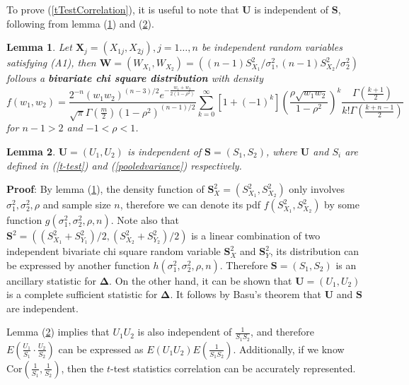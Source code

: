 \documentclass[12pt, a4paper]{article}
\newtheorem{lemma}{Lemma}
\begin{document}
	To prove (\ref{tTestCorrelation}), it is useful to note that $\bm U$ is independent of $\bm S$,
	following from lemma (\ref{lemmabiChisq}) and (\ref{lemmaIndep}).
	\begin{lemma}\label{lemmabiChisq}
		Let $\bm X_j = (X_{1j}, X_{2j}), j=1 \ldots, n$ be independent random variables satisfying (A1),
		then $\bm W = (W_{X_1},W_{X_2}) =((n-1)S_{X_1}^2/{\sigma_1^2}, (n-1)S_{X_2}^2/{\sigma_2^2})$ 
		follows a \textbf{bivariate chi square distribution} with density \citep{joarder2009moments} 
		\begin{equation}\label{biChisq}
			f(w_1, w_2) = \frac{2^{-n}(w_1w_2)^{(n-3)/2}e^{-\frac{w_1 +
						w_2}{2(1-\rho^2)}}}{\sqrt{\pi}\Gamma(\frac{m}{2})(1-\rho^2)^{(n-1)/2}}\sum_{k=0}^{\infty}[1 +
			(-1)^k]\left(\frac{\rho\sqrt{w_1w_2}}{1-\rho^2}\right)^k\frac{\Gamma(\frac{k+1}{2})}{k!\Gamma(\frac{k
					+ n-1}{2})}
		\end{equation}
		for $n-1>2$ and $-1<\rho < 1$.
	\end{lemma}
	\begin{lemma}\label{lemmaIndep}
		$\bm U =(U_1, U_2)$ is independent of $\bm S = (S_1 ,S_2)$, where $\bm U$ and $S_i$ are defined in
		(\ref{t-test})  and (\ref{pooledvariance}) respectively.
	\end{lemma}
	\textbf{Proof}: By lemma (\ref{lemmabiChisq}), the density function of $\bm S^2_X=
	(S_{X_1}^2,S_{X_2}^2 )$ only involves $\sigma^2_1, \sigma^2_2, \rho$ and sample size $n$, therefore
	we can denote its pdf $f(S_{X_1}^2,S_{X_2}^2)$ by some function $g(\sigma^2_1, \sigma^2_2, \rho,
	n)$. Note also that $\bm S^2 = \left((S_{X_1}^2 +S_{Y_1}^2 )/2, (S_{X_2}^2 + S_{Y_2}^2)/2\right) $
	is a linear combination of two independent bivariate chi square random variable $\bm S^2_X$ and $\bm
	S^2_Y$, its distribution can be expressed by another function $h(\sigma^2_1, \sigma^2_2, \rho, n)$.
	Therefore $\bm S = (S_1 ,S_2)$ is an ancillary statistic for $\bm \Delta$. On the other hand, it can
	be shown that $\bm U =(U_1, U_2)$ is a complete sufficient statistic for $\bm \Delta$. It follows by
	Basu's theorem that $\bm U$ and $\bm S$ are independent. 
	
	
	Lemma (\ref{lemmaIndep}) implies that  $U_1U_2$ is also independent of $\frac{1}{S_1S_2}$, and
	therefore $E(\frac{U_1}{S_1} \cdot\frac{U_2}{S_2})$ can be expressed as
	$E(U_1U_2)E(\frac{1}{S_1S_2})$. Additionally, if we know $\text{Cor}(\frac{1}{S_1}, \frac{1}{S_2})$,
	then the $t$-test statistics correlation can be accurately represented. 
	
\end{document}
